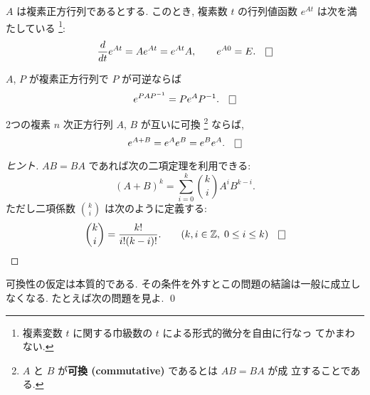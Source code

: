 \documentclass[12pt,twoside]{jarticle}
\begin{document}
\begin{question}[行列の指数函数の導函数]
  \label{q:d-exp}
  $A$ は複素正方行列であるとする. 
  このとき, 複素数 $t$ の行列値函数 $e^{At}$ は次を満たしている%
  \footnote{複素変数 $t$ に関する巾級数の $t$ による形式的微分を自由に行なっ
    てかまわない.}:
  \begin{equation*}
    \od{t}e^{At} = A e^{At} = e^{At} A,
    \qquad e^{A0} = E.
    \qed
  \end{equation*}
\end{question}


\begin{question}[行列の相似変換との指数函数の可換性]
  \label{q:exp(PAPinv)}
  $A$, $P$ が複素正方行列で $P$ が可逆ならば
  \begin{equation*}
    e^{PAP^{-1}} = P e^A P^{-1}.
    \qed
  \end{equation*}
\end{question}


\begin{question}[可換な行列の和の指数函数]
  \label{q:exp(A+B)}
  2つの複素 $n$ 次正方行列 $A$, $B$ が互いに可換%
  \footnote{$A$ と $B$ が{\bf 可換 (commutative)} であるとは $AB = BA$ が成
    立することである.}%
  ならば,
  \begin{equation*}
    e^{A+B} = e^A e^B = e^B e^A.
    \qed
  \end{equation*}
\end{question}

\begin{proof}[ヒント]
  $AB=BA$ であれば次の二項定理を利用できる:
  \begin{equation*}
    (A + B)^k = \sum_{i=0}^k \binom{k}{i} A^i B^{k-i}.
  \end{equation*}
  ただし二項係数 $\binom{k}{i}$ は次のように定義する:
  \begin{equation*}
    \binom{k}{i} = \frac{k!}{i!(k-i)!}.
    \qquad (k,i\in\Z,\; 0\le i\le k)
    \qed
  \end{equation*}
\end{proof}

\begin{rem}
  可換性の仮定は本質的である.  
  その条件を外すとこの問題の結論は一般に成立しなくなる.
  たとえば次の問題を見よ.
  \qed
\end{rem}

\end{document}
